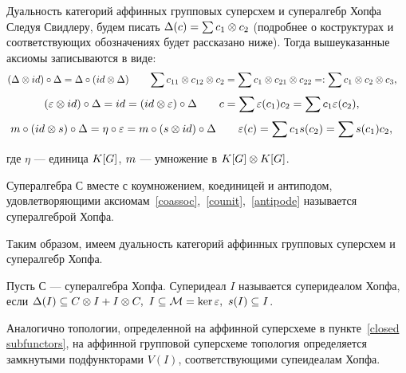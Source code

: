 \begin{subsection}{Дуальность категорий аффинных групповых суперсхем и супералгебр Хопфа}
  Следуя Свидлеру, будем писать $ \Delta(c) = \sum c_1 \otimes c_2 $ 
  (подробнее о коструктурах и соответствующих обозначениях будет рассказано ниже).
  Тогда вышеуказанные аксиомы записываются в виде:
  \begin{align*}
    (\Delta \otimes id) \circ \Delta = \Delta \circ (id \otimes \Delta) & \qquad
    \sum c_{11} \otimes c_{12} \otimes c_2 = \sum c_1 \otimes c_{21} \otimes c_{22} =: \sum c_1 \otimes c_2 \otimes c_3,
  \end{align*}
  \begin{align*}
    (\varepsilon \otimes id) \circ \Delta = id = (id \otimes \varepsilon) \circ \Delta & \qquad
    c = \sum \varepsilon(c_1) c_2 = \sum c_1 \varepsilon(c_2),
  \end{align*}
  \begin{align*}
    m \circ (id \otimes s) \circ \Delta = \eta \circ \varepsilon = m \circ (s \otimes id) \circ \Delta & \qquad
    \varepsilon (c) = \sum c_1 s(c_2) = \sum s(c_1) c_2,
  \end{align*}

  где $ \eta $ --- единица $ K[G] $, $ m $ --- умножение в $ K[G] \otimes K[G] $.

  \begin{definition}
    Супералгебра $ С $ вместе с коумножением, коединицей и антиподом,
    удовлетворяющими аксиомам~\ref{coassoc},~\ref{counit},~\ref{antipode}
    называется супералгеброй Хопфа.
  \end{definition}

  Таким образом, имеем дуальность категорий аффинных групповых суперсхем
  и супералгебр Хопфа.

  \begin{definition}
    Пусть $ С $ --- супералгебра Хопфа. Суперидеал $ I $ называется суперидеалом Хопфа,
    если $ \Delta (I) \subseteq C \otimes I + I \otimes C, ~I \subseteq \mathcal{M} = \ker\varepsilon, ~s(I) \subseteq I $.
  \end{definition}

  Аналогично топологии, определенной на аффинной суперсхеме
  в пункте~\ref{closed subfunctors}, на аффинной групповой суперсхеме
  топология определяется замкнутыми подфункторами $ V(I) $, соответствующими
  супеидеалам Хопфа.
  
\end{subsection}

